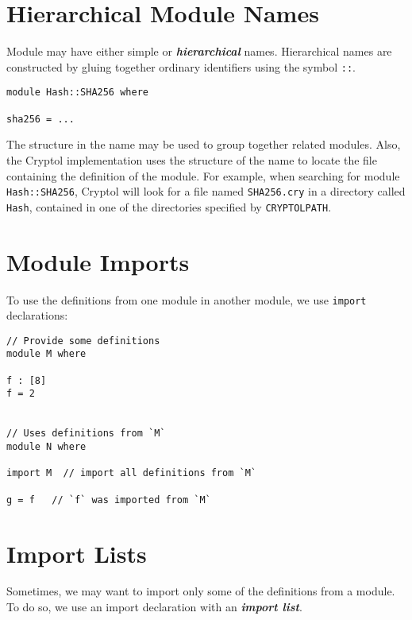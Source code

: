 \hypertarget{hierarchical-module-names}{%
\section{Hierarchical Module Names}\label{hierarchical-module-names}}

Module may have either simple or \textbf{\emph{hierarchical}} names.
Hierarchical names are constructed by gluing together ordinary
identifiers using the symbol \texttt{::}.

\begin{verbatim}
module Hash::SHA256 where

sha256 = ...
\end{verbatim}

The structure in the name may be used to group together related modules.
Also, the Cryptol implementation uses the structure of the name to
locate the file containing the definition of the module. For example,
when searching for module \texttt{Hash::SHA256}, Cryptol will look for a
file named \texttt{SHA256.cry} in a directory called \texttt{Hash},
contained in one of the directories specified by \texttt{CRYPTOLPATH}.

\hypertarget{module-imports}{%
\section{Module Imports}\label{module-imports}}

To use the definitions from one module in another module, we use
\texttt{import} declarations:

\begin{verbatim}
// Provide some definitions
module M where

f : [8]
f = 2


// Uses definitions from `M`
module N where

import M  // import all definitions from `M`

g = f   // `f` was imported from `M`
\end{verbatim}

\hypertarget{import-lists}{%
\section{Import Lists}\label{import-lists}}

Sometimes, we may want to import only some of the definitions from a
module. To do so, we use an import declaration with an
\textbf{\emph{import list}}.

